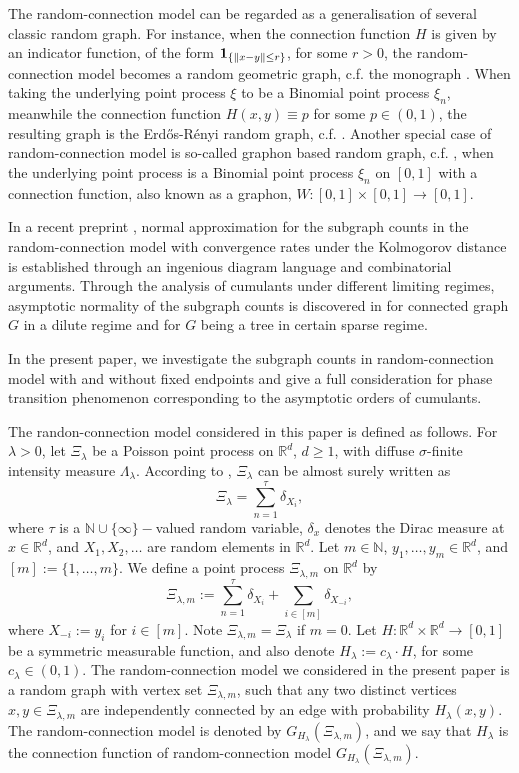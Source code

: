 \documentclass[12pt]{article}
\newcommand{\R}{\mathbb{R}}
\newcommand{\bone}{{\bf 1}}
\newcommand{\N}{\mathbb{N}}
\def\N{{\mathord{\mathbb N}}}
\numberwithin{equation}{section}
\begin{document}
The random-connection model can be regarded as a generalisation of several classic random graph. For instance, when the connection function $H$ is given by an indicator function, of the form $\bone_{\{\|x-y\|\le r\}}$, for some $r>0$, the random-connection model becomes a random geometric graph, c.f. the monograph \cite{penrosebk}. When taking the underlying point process $\xi$ to be a Binomial point process $\xi_n$, meanwhile the connection function $H(x,y)\equiv p$ for some $p\in(0,1)$, the resulting graph is the Erd{\H o}s-R\'enyi random graph, c.f. \cite{gilbert59,ER}. Another special case of random-connection model is so-called graphon based random graph, c.f. \cite{zhang22,bhattacharya23}, when the underlying point process is a Binomial point process $\xi_n$ on $[0,1]$ with a connection function, also known as a graphon, $W:[0,1]\times[0,1]\to[0,1]$.

In a recent preprint \cite{LiuPrivault23}, normal approximation for the subgraph counts in the random-connection model with convergence rates under the Kolmogorov distance is established through an ingenious diagram language and combinatorial arguments. Through the analysis of cumulants under different limiting regimes, asymptotic normality of the subgraph counts is discovered in \cite{LiuPrivault23} for connected graph $G$ in a dilute regime and for $G$ being a tree in certain sparse regime. 

In the present paper, we investigate the subgraph counts in random-connection model with and without fixed endpoints and give a full consideration for phase transition phenomenon corresponding to the asymptotic orders of cumulants. 

The randon-connection model considered in this paper is defined as follows. For $\lambda > 0$, let $\Xi_\lambda$ be a Poisson point process on $\R^d$, $d\geq 1$, with diffuse $\sigma$-finite intensity measure $\Lambda_\lambda$. According to \cite[Corollary~6.5]{LastPenrose17}, $\Xi_\lambda$ can be almost surely written as 
$$\Xi_\lambda=\sum_{n=1}^\tau\delta_{X_i},$$
where $\tau$ is a $\N\cup\{\infty\}-$valued random variable, $\delta_x$ denotes the Dirac measure at $x\in\R^d$, and $X_1,X_2,\dots$ are random elements in $\R^d$. Let $m\in\N$, $y_1,\dots,y_m\in\R^d$, and $[m]:=\{1,\dots,m\}$. We define a point process $\Xi_{\lambda,m}$ on $\R^d$ by 
$$\Xi_{\lambda,m}:=\sum_{n=1}^\tau\delta_{X_i}+\sum_{i\in[m]}\delta_{X_{-i}},$$
where $X_{-i}:=y_i$ for $i\in [m]$. Note $\Xi_{\lambda,m}=\Xi_\lambda$ if $m=0$. Let $H:\R^d\times \R^d\to [0,1]$ be a symmetric measurable function, and also denote $H_\lambda:=c_\lambda\cdot H$, for some $c_\lambda\in(0,1)$. The random-connection model we considered in the present paper is a random graph with vertex set $\Xi_{\lambda,m}$, such that any two distinct vertices $x,y\in\Xi_{\lambda,m}$ are independently connected by an edge with probability $H_\lambda(x,y)$. The random-connection model is denoted by $G_{H_\lambda}(\Xi_{\lambda,m})$, and we say that $H_\lambda$ is the connection function of random-connection model $G_{H_\lambda}(\Xi_{\lambda,m})$.
\end{document}
